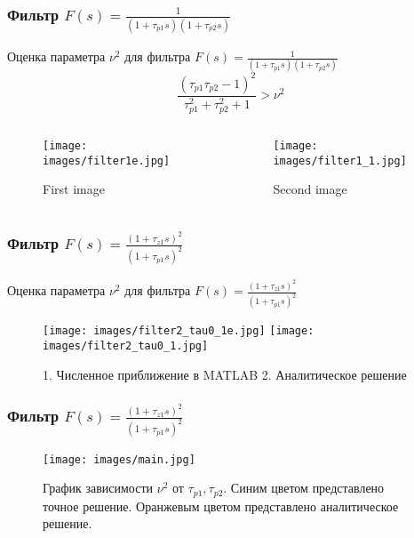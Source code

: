 \documentclass{beamer}
\begin{document}
\begin{frame}
\frametitle{Фильтр $F(s) = \frac{1}{(1+\tau_{p1}s)(1+\tau_{p2}s)}$}
Оценка параметра $\nu^2$ для фильтра $F(s) = \frac{1}{(1+\tau_{p1}s)(1+\tau_{p2}s)}$
\begin{equation*}
\frac{(\tau_{p1}\tau_{p2} - 1)^2}{\tau_{p1}^2 + \tau_{p2}^2 + 1} > \nu^2
\end{equation*} 
\begin{columns}[onlytextwidth]
\begin{column}{.45\textwidth}
\begin{figure}
  \texttt{[image: images/filter1e.jpg]}
  \caption{First image}
\end{figure}
\end{column}
\hfill
\begin{column}{.45\textwidth}
\begin{figure}
  \texttt{[image: images/filter1\_1.jpg]}
  \caption{Second image}
\end{figure}
\end{column}
\end{columns}
\end{frame}


\begin{frame}
\frametitle{Фильтр $F(s) = \frac{(1+\tau_{z1}s)^2}{(1+\tau_{p1}s)^2}$}

Оценка параметра $\nu^2$ для фильтра $F(s) = \frac{(1+\tau_{z1}s)^2}{(1+\tau_{p1}s)^2}$
  \begin{figure}[H]
  \texttt{[image: images/filter2\_tau0\_1e.jpg]}
  \texttt{[image: images/filter2\_tau0\_1.jpg]}
    \caption{1. Численное приближение в MATLAB 2. Аналитическое решение}
    \end{figure}

\end{frame}

\begin{frame}
\frametitle{Фильтр $F(s) = \frac{(1+\tau_{z1}s)^2}{(1+\tau_{p1}s)^2}$}

  \begin{figure}[H] 
  \texttt{[image: images/main.jpg]}
\caption{График зависимости $\nu^2$ от $\tau_{p1}, \tau_{p2}$.  Синим цветом представлено точное решение. Оранжевым цветом представлено аналитическое решение.}
\end{figure}

\end{frame}
\end{document}
